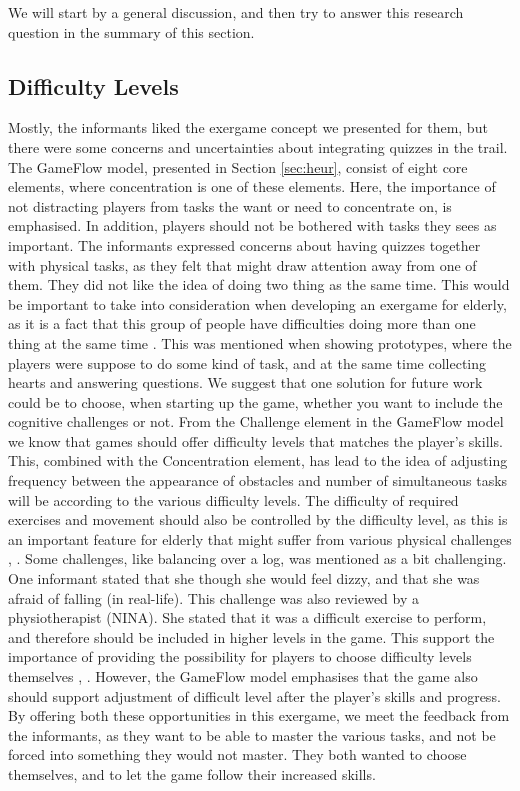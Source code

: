 We will start by a general discussion, and then try to answer this research question in the summary of this section. 

\subsection{Difficulty Levels}

Mostly, the informants liked the exergame concept we presented for them, but there were some concerns and uncertainties about integrating quizzes in the trail. The GameFlow model, presented in Section \ref{sec:heur}, consist of eight core elements, where concentration is one of these elements. Here, the importance of not distracting players from tasks the want or need to concentrate on, is emphasised. In addition, players should not be bothered with tasks they sees as important. The informants expressed concerns about having quizzes together with physical tasks, as they felt that might draw attention away from one of them. They did not like the idea of doing two thing as the same time. This would be important to take into consideration when developing an exergame for elderly, as it is a fact that this group of people have difficulties doing more than one thing at the same time \cite{bruin}. This was mentioned when showing prototypes, where the players were suppose to do some kind of task, and at the same time collecting hearts and answering questions. We suggest that one solution for future work could be to choose, when starting up the game, whether you want to include the cognitive challenges or not. From the Challenge element in the GameFlow model we know that games should offer difficulty levels that matches the player's skills. This, combined with the Concentration element, has lead to the idea of adjusting frequency between the appearance of obstacles and number of simultaneous tasks will be according to the various difficulty levels. The difficulty of required exercises and movement should also be controlled by the difficulty level, as this is an important feature for elderly that might suffer from various physical challenges \cite{gregor}, \cite{gerling1}. Some challenges, like balancing over a log, was mentioned as a bit challenging. One informant stated that she though she would feel dizzy, and that she was afraid of falling (in real-life). This challenge was also reviewed by a physiotherapist (NINA). She stated that it was a difficult exercise to perform, and therefore should be included in higher levels in the game. This support the importance of providing the possibility for players to choose difficulty levels themselves \cite{gregor}, \cite{gerling1}. However, the GameFlow model emphasises that the game also should support adjustment of difficult level after the player's skills and progress. By offering both these opportunities in this exergame, we meet the feedback from the informants, as they want to be able to master the various tasks, and not be forced into something they would not master. They both wanted to choose themselves, and to let the game follow their increased skills. 

